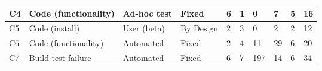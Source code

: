 \begin{landscape}
\begin{table}[tbp]
{\begin{tabular}{p{1.6cm}p{2.6cm}p{2.2cm}p{2.2cm}p{1.6cm}p{1.6cm}p{1.6cm}p{1.6cm}p{1.6cm}p{1.6cm}}
\hline
\vspace{0.5pt} C4 & \vspace{0.5pt} Code (functionality) & \vspace{0.5pt} Ad-hoc test & \vspace{0.5pt} Fixed & \vspace{0.5pt} 6 & \vspace{0.5pt} 1 & \vspace{0.5pt} 0 & \vspace{0.5pt} 7 & \vspace{0.5pt} 5 & \vspace{0.5pt} 16 \\
\hline
\vspace{0.5pt} C5 & \vspace{0.5pt} Code (install) & \vspace{0.5pt} User (beta) & \vspace{0.5pt} By Design & \vspace{0.5pt} 2 & \vspace{0.5pt} 3 & \vspace{0.5pt} 0 & \vspace{0.5pt} 2 & \vspace{0.5pt} 2 & \vspace{0.5pt} 12 \\
\hline
\vspace{0.5pt} C6 & \vspace{0.5pt} Code (functionality) & \vspace{0.5pt} Automated & \vspace{0.5pt} Fixed & \vspace{0.5pt} 2 & \vspace{0.5pt} 4 & \vspace{0.5pt} 11 & \vspace{0.5pt} 29 & \vspace{0.5pt} 6 & \vspace{0.5pt} 20 \\
\hline
\vspace{0.5pt} C7 & \vspace{0.5pt} Build test failure & \vspace{0.5pt} Automated & \vspace{0.5pt} Fixed & \vspace{0.5pt} 6 & \vspace{0.5pt} 7 & \vspace{0.5pt} 197 & \vspace{0.5pt} 14 & \vspace{0.5pt} 6 & \vspace{0.5pt} 34 \\

\end{tabular}}
\end{table}
\end{landscape}
